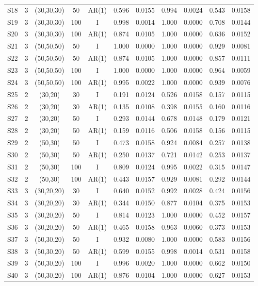 \begin{table}[ht]
\begin{tabular}{ccccccccccc}
S18 & 3 & (30,30,30) & 50 & AR(1) & 0.596 & 0.0155 & 0.994 & 0.0024 & 0.543 & 0.0158 \\
S19 & 3 & (30,30,30) & 100 & I & 0.998 & 0.0014 & 1.000 & 0.0000 & 0.708 & 0.0144 \\
S20 & 3 & (30,30,30) & 100 & AR(1) & 0.874 & 0.0105 & 1.000 & 0.0000 & 0.636 & 0.0152 \\
S21 & 3 & (50,50,50) & 50 & I & 1.000 & 0.0000 & 1.000 & 0.0000 & 0.929 & 0.0081 \\
S22 & 3 & (50,50,50) & 50 & AR(1) & 0.874 & 0.0105 & 1.000 & 0.0000 & 0.857 & 0.0111 \\
S23 & 3 & (50,50,50) & 100 & I & 1.000 & 0.0000 & 1.000 & 0.0000 & 0.964 & 0.0059 \\
S24 & 3 & (50,50,50) & 100 & AR(1) & 0.995 & 0.0022 & 1.000 & 0.0000 & 0.939 & 0.0076 \\
S25 & 2 & (30,20) & 30 & I & 0.191 & 0.0124 & 0.526 & 0.0158 & 0.157 & 0.0115 \\
S26 & 2 & (30,20) & 30 & AR(1) & 0.135 & 0.0108 & 0.398 & 0.0155 & 0.160 & 0.0116 \\
S27 & 2 & (30,20) & 50 & I & 0.293 & 0.0144 & 0.678 & 0.0148 & 0.179 & 0.0121 \\
S28 & 2 & (30,20) & 50 & AR(1) & 0.159 & 0.0116 & 0.506 & 0.0158 & 0.156 & 0.0115 \\
S29 & 2 & (50,30) & 50 & I & 0.473 & 0.0158 & 0.924 & 0.0084 & 0.257 & 0.0138 \\
S30 & 2 & (50,30) & 50 & AR(1) & 0.250 & 0.0137 & 0.721 & 0.0142 & 0.253 & 0.0137 \\
S31 & 2 & (50,30) & 100 & I & 0.809 & 0.0124 & 0.995 & 0.0022 & 0.315 & 0.0147 \\
S32 & 2 & (50,30) & 100 & AR(1) & 0.443 & 0.0157 & 0.929 & 0.0081 & 0.292 & 0.0144 \\
S33 & 3 & (30,20,20) & 30 & I & 0.640 & 0.0152 & 0.992 & 0.0028 & 0.424 & 0.0156 \\
S34 & 3 & (30,20,20) & 30 & AR(1) & 0.344 & 0.0150 & 0.877 & 0.0104 & 0.375 & 0.0153 \\
S35 & 3 & (30,20,20) & 50 & I & 0.814 & 0.0123 & 1.000 & 0.0000 & 0.452 & 0.0157 \\
S36 & 3 & (30,20,20) & 50 & AR(1) & 0.465 & 0.0158 & 0.963 & 0.0060 & 0.373 & 0.0153 \\
S37 & 3 & (50,30,20) & 50 & I & 0.932 & 0.0080 & 1.000 & 0.0000 & 0.583 & 0.0156 \\
S38 & 3 & (50,30,20) & 50 & AR(1) & 0.599 & 0.0155 & 0.998 & 0.0014 & 0.531 & 0.0158 \\
S39 & 3 & (50,30,20) & 100 & I & 0.996 & 0.0020 & 1.000 & 0.0000 & 0.662 & 0.0150 \\
S40 & 3 & (50,30,20) & 100 & AR(1) & 0.876 & 0.0104 & 1.000 & 0.0000 & 0.627 & 0.0153 \\
\hline
\end{tabular}
\end{table}
